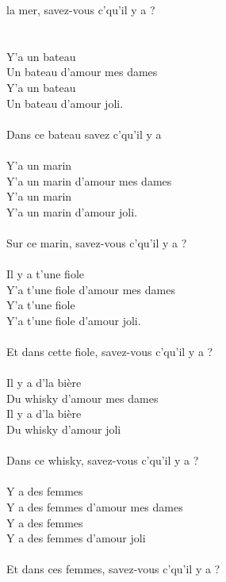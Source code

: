 
 la mer, savez-vous c'qu'il y a ? \bissimple
\\\\\\Y'a un bateau
\\Un bateau d'amour mes dames
\\Y'a un bateau
\\Un bateau d'amour joli.
\\\\Dans ce bateau savez c'qu'il y a \bissimple
\\\\Y'a un marin
\\Y'a un marin d'amour mes dames
\\Y'a un marin
\\Y'a un marin d'amour joli.
\\\\Sur ce marin, savez-vous c'qu'il y a ? \bissimple
\\\\Il y a t'une fiole
\\Y'a t'une fiole d'amour mes dames
\\Y'a t'une fiole
\\Y'a t'une fiole d'amour joli.
\\\\Et dans cette fiole, savez-vous c'qu'il y a ? \bissimple
\\\\Il y a d'la bière
\\Du whisky d'amour mes dames
\\Il y a d'la bière
\\Du whisky d'amour joli
\\\\Dans ce whisky, savez-vous c'qu'il y a ? \bissimple
\\\\Y a des femmes
\\Y a des femmes d'amour mes dames
\\Y a des femmes
\\Y a des femmes d'amour joli
\\\\Et dans ces femmes, savez-vous c'qu'il y a ? \bissimple
